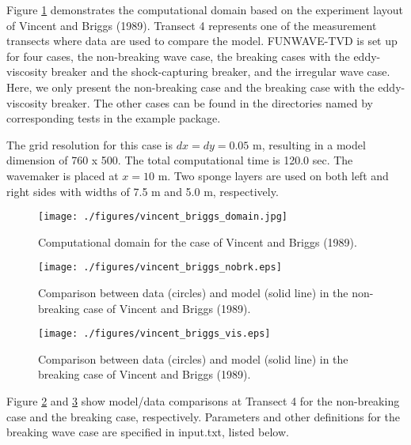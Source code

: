 \documentclass[11pt]{article}
\begin{document}
Figure \ref{vincent_briggs} demonstrates the computational domain based on the experiment layout of Vincent and Briggs (1989). Transect 4 represents one of the measurement transects where data are used to compare the model. FUNWAVE-TVD is set up for four cases, the non-breaking wave case, the breaking cases with the eddy-viscosity breaker and the shock-capturing breaker, and the irregular wave case. Here, we only present the non-breaking case and the breaking case with the eddy-viscosity breaker. The other cases can be found in the directories named by corresponding tests in the example package. 

The grid resolution for this case is $dx = dy = 0.05$ m, resulting in a model dimension of 760 x 500. The total computational time is 120.0 sec. The wavemaker is placed at $x = 10$ m.  Two sponge layers are used on both left and right sides with widths of 7.5 m and 5.0 m, respectively. 


 \begin{figure}[htbp]
\centering
\texttt{[image: ./figures/vincent\_briggs\_domain.jpg]}
\caption{Computational domain for the case of Vincent and Briggs (1989).}
\label{vincent_briggs}
\end{figure}

\begin{figure}[htbp]
\centering
\texttt{[image: ./figures/vincent\_briggs\_nobrk.eps]}
\caption{Comparison between data (circles) and model (solid line) in the non-breaking case of Vincent and Briggs (1989).}
\label{vincent_briggs_vis}
\end{figure}


\begin{figure}[htbp]
\centering
\texttt{[image: ./figures/vincent\_briggs\_vis.eps]}
\caption{Comparison between data (circles) and model (solid line) in the breaking case of Vincent and Briggs (1989).}
\label{vincent_briggs_nonbrk}
\end{figure}


Figure \ref{vincent_briggs_vis} and \ref{vincent_briggs_nonbrk} show model/data comparisons at Transect 4 for the non-breaking case and the breaking case, respectively.  Parameters and other definitions for the breaking wave case are specified in input.txt, listed below. 
\end{document}

